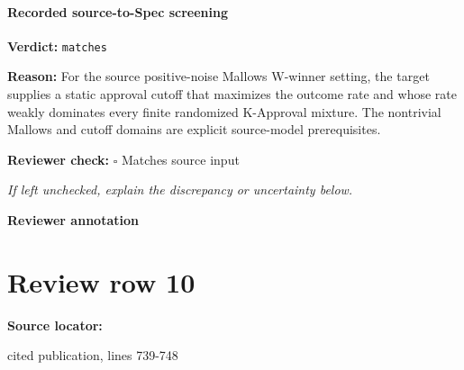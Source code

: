 \documentclass[10pt]{article}
\newcommand{\reviewerbox}{%
  \par\noindent\fbox{\parbox{0.96\linewidth}{\rule{0pt}{0.38in}}}\par
}
\newcommand{\reviewmatch}[1]{%
  \par\noindent\textbf{Reviewer check:} $\square$\; #1\par
  \noindent\emph{If left unchecked, explain the discrepancy or uncertainty below.}\par
}
\begin{document}
\paragraph{Recorded source-to-Spec screening}
\textbf{Verdict:} \texttt{matches}
\\
{\raggedright
\textbf{Reason:} For the source positive-\allowbreak{}noise Mallows W-\allowbreak{}winner setting, the target supplies a static approval cutoff that maximizes the outcome rate and whose rate weakly dominates every finite randomized K-\allowbreak{}Approval mixture.\allowbreak{} The nontrivial Mallows and cutoff domains are explicit source-\allowbreak{}model prerequisites.\allowbreak{}
\par}
\reviewmatch{Matches source input}
\noindent\textbf{Reviewer annotation}\par
\reviewerbox
\clearpage
\hypertarget{source-claim-b02fd12e20da7ee2}{}
\section*{Review row 10}
\textbf{Source locator:} {\footnotesize\raggedright cited publication, lines 739-\allowbreak{}748\par}
\end{document}
